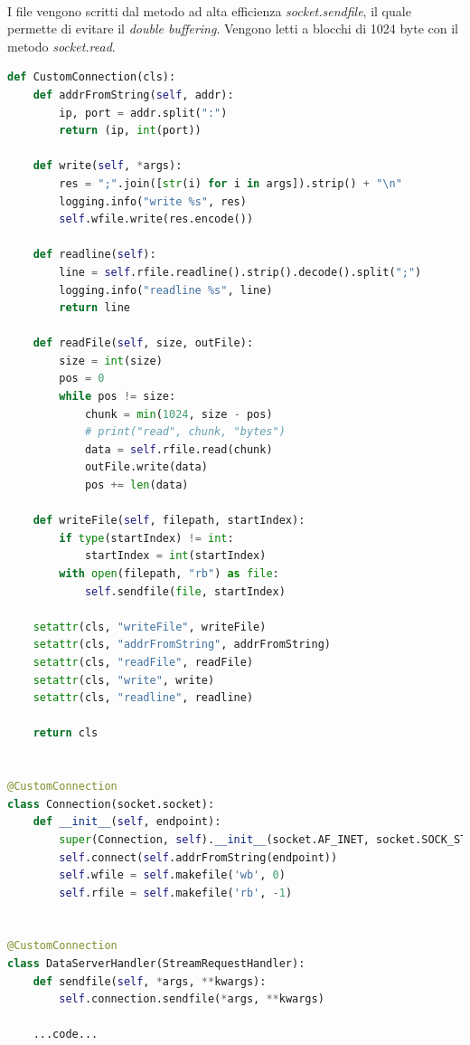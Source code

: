 \documentclass[11pt,a4paper,english]{article}
\begin{document}
\paragraph{} I file vengono scritti dal metodo ad alta efficienza \emph{socket.sendfile}, il quale permette di evitare il \emph{double buffering}. Vengono letti a blocchi di 1024 byte con il metodo \emph{socket.read}.

\begin{lstlisting}[language=Python, title=Codice]
def CustomConnection(cls):
    def addrFromString(self, addr):
        ip, port = addr.split(":")
        return (ip, int(port))

    def write(self, *args):
        res = ";".join([str(i) for i in args]).strip() + "\n"
        logging.info("write %s", res)
        self.wfile.write(res.encode())

    def readline(self):
        line = self.rfile.readline().strip().decode().split(";")
        logging.info("readline %s", line)
        return line

    def readFile(self, size, outFile):
        size = int(size)
        pos = 0
        while pos != size:
            chunk = min(1024, size - pos)
            # print("read", chunk, "bytes")
            data = self.rfile.read(chunk)
            outFile.write(data)
            pos += len(data)

    def writeFile(self, filepath, startIndex):
        if type(startIndex) != int:
            startIndex = int(startIndex)
        with open(filepath, "rb") as file:
            self.sendfile(file, startIndex)

    setattr(cls, "writeFile", writeFile)
    setattr(cls, "addrFromString", addrFromString)
    setattr(cls, "readFile", readFile)
    setattr(cls, "write", write)
    setattr(cls, "readline", readline)

    return cls


@CustomConnection
class Connection(socket.socket):
    def __init__(self, endpoint):
        super(Connection, self).__init__(socket.AF_INET, socket.SOCK_STREAM)
        self.connect(self.addrFromString(endpoint))
        self.wfile = self.makefile('wb', 0)
        self.rfile = self.makefile('rb', -1)


@CustomConnection
class DataServerHandler(StreamRequestHandler):
    def sendfile(self, *args, **kwargs):
        self.connection.sendfile(*args, **kwargs)
    
    ...code...

\end{lstlisting}
\end{document}
